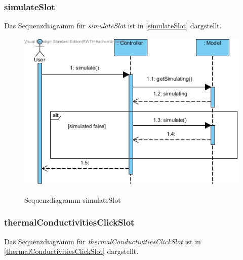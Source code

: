 \subsubsection*{simulateSlot}

Das Sequenzdiagramm für \emph{simulateSlot} ist in \ref{simulateSlot} dargstellt.

\begin{figure}[H]
	\centering
	\includegraphics[scale=.6]{Bilder/Controller__simulateSlot().jpg}\\
	\caption{Sequenzdiagramm simulateSlot}
	\label{Sequenzdiagramm simulateSlot}
\end{figure}

\subsubsection*{thermalConductivitiesClickSlot}

Das Sequenzdiagramm für \emph{thermalConductivitiesClickSlot} ist in \ref{thermalConductivitiesClickSlot} dargstellt.

